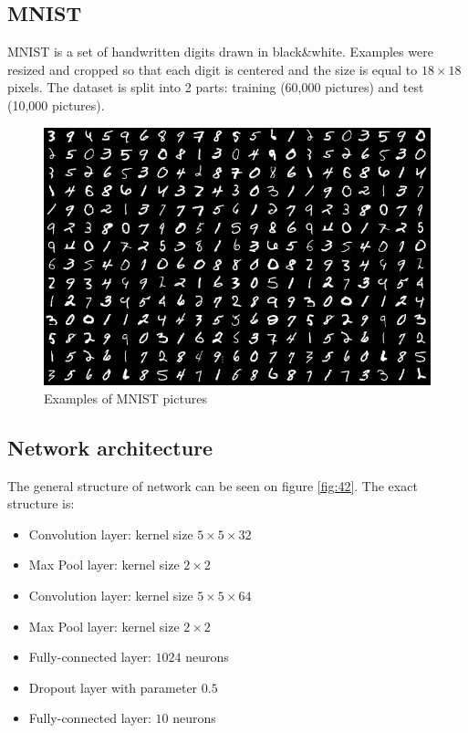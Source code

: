\documentclass[licencjacka]{pracamgr}
\begin{document}
 		\subsection{MNIST}
 			MNIST is a set of handwritten digits drawn in black\&white. Examples were resized and cropped so that each digit is centered and the size is equal to $18\times18$ pixels. The dataset is split into 2 parts: training (60,000 pictures) and test (10,000 pictures).
 			\begin{figure}[h]
				\caption{Examples of MNIST pictures}
				\centering
				\includegraphics[width=\textwidth]{images/mnist}
			\end{figure}
 		\subsection{Network architecture}
 		The general structure of network can be seen on figure \ref{fig:42}. The exact structure is:
 			\begin{itemize}
 			\item Convolution layer: kernel size $5 \times 5 \times 32$
 			\item Max Pool layer: kernel size $2 \times 2$
 			\item Convolution layer: kernel size $5 \times 5 \times 64$
 			\item Max Pool layer: kernel size $2 \times 2$
 			\item Fully-connected layer: $1024$ neurons
 			\item Dropout layer with parameter $0.5$
 			\item Fully-connected layer: $10$ neurons
 			\end{itemize}
\end{document}
